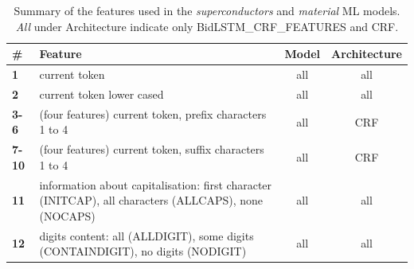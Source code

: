 \begin{table}
    \centering
    \caption{Summary of the features used in the \textit{superconductors} and \textit{material} ML models. \textit{All} under Architecture indicate only BidLSTM\_CRF\_FEATURES and CRF.}
    \begin{tabular}{l m{30em} c c}
        \toprule
        \textbf{\#}   & \textbf{Feature}                                                                                                                                                                                                                                         & \textbf{Model}  & \textbf{Architecture} \\
        \midrule
        \textbf{1}    & current token                                                                                                                                                                                                                                            & all             & all                   \\
        \textbf{2}    & current token lower cased                                                                                                                                                                                                                                & all             & all                   \\
        \textbf{3-6}  & (four features) current token, prefix characters 1 to 4                                                                                                                                                                                                  & all             & CRF                   \\
        \textbf{7-10} & (four features) current token, suffix characters 1 to 4                                                                                                                                                                                                  & all             & CRF                   \\
        \textbf{11}   & information about capitalisation: first character (INITCAP), all characters (ALLCAPS), none (NOCAPS)                                                                                                                                                     & all             & all                   \\
        \textbf{12}   & digits content: all (ALLDIGIT), some digits (CONTAINDIGIT), no digits (NODIGIT)                                                                                                                                                                          & all             & all                   \\

\end{tabular}
\end{table}
